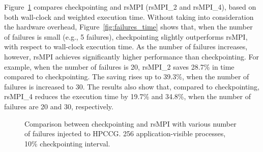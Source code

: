 Figure~\ref{fig:multiple_failure} compares checkpointing and rsMPI (rsMPI\_2 and rsMPI\_4), based on both wall-clock and weighted execution time. Without taking into consideration the hardware overhead, Figure~\ref{fig:failures_time} shows that, when the number of failures is small (e.g., 5 failures), checkpointing slightly outperforms rsMPI,  with respect to wall-clock execution time. As the number of failures increases, however, rsMPI achieves significantly higher performance than checkpointing. For example, when the number of failures is 20, rsMPI\_2 saves 28.7\% in time compared to checkpointing. The saving rises up to 39.3\%, when the number of failures is increased to $30$. The results also show that, compared to checkpointing, rsMPI\_4 reduces the execution time by 19.7\% and 34.8\%, when the number of failures are 20 and 30, respectively. 

\begin{figure}[!t]
  \begin{center}
  \end{center}
  \vskip -0.1in
  \caption{Comparison between checkpointing and rsMPI with various number of failures injected to HPCCG. 256 application-visible processes, 10\% checkpointing interval.}
  \label{fig:multiple_failure}
  \vskip -0.2in
\end{figure}


